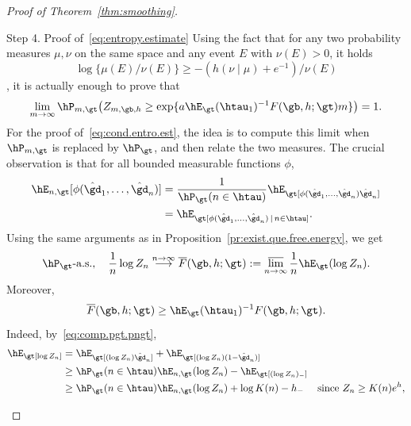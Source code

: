 \begin{proof}[Proof of Theorem~\ref{thm:smoothing}]
\begin{laststep}{Step 4. Proof of~\eqref{eq:entropy.estimate}}
Using the fact that for any two probability measures $\mu,\nu$ on the same space and any event $E$ with $\nu(E) > 0$, it holds
\begin{equation}
\log\{\mu(E)/\nu(E)\} \geq -(h(\nu \mid \mu) + e^{-1})/\nu(E)
\end{equation}
\cite[Equation~(A.13)]{Gi2007}, {it} is actually enough to prove that
\begin{equation}\label{eq:cond.entro.est}
\lim_{m\to\infty} \hP_{m,\gt} \big(Z_{m,\gb,h} \geq \exp\{a \hE_\gt(\htau_1)^{-1} F(\gb,h;\gt)m\} \big) = 1.
\end{equation}
For the proof of~\eqref{eq:cond.entro.est}, the idea is to compute this limit when $\hP_{m,\gt}$ is replaced by $\hP_\gt$, and then relate the two measures. The crucial observation is that for all bounded measurable functions $\phi$,
\begin{equation}\label{eq:comp.pgt.pngt}
\begin{aligned}
\hE_{n,\gt} [\phi(\hat \gd_1,\ldots,\hat \gd_n)] &= \frac{1}{\hP_\gt(n \in \htau)} \hE_\gt[\phi(\hat \gd_1,\ldots,\hat \gd_n) \hat \gd_n]\\
&= \hE_\gt[\phi(\hat \gd_1,\ldots,\hat \gd_n) \, \mid \, n \in \htau].
\end{aligned}
\end{equation}
Using the same arguments as in Proposition~\ref{pr:exist.que.free.energy}, we get
\begin{equation}\label{eq:conv.to.olF}
\hP_\gt \text{-a.s.}, \quad \frac{1}{n} \log Z_n \stackrel{n\to\infty}{\longrightarrow} \overline F(\gb,h;\gt) := \varlimsup_{n\to\infty} \frac{1}{n} \hE_\gt(\log Z_n).
\end{equation}
Moreover,
\begin{equation}\label{eq:comp.olF.F}
\overline F(\gb,h;\gt) \geq \hE_\gt(\htau_1)^{-1} F(\gb,h;\gt).
\end{equation}
Indeed, by~\eqref{eq:comp.pgt.pngt},
\begin{equation}
\begin{aligned}
\hE_\gt[\log Z_n] &= \hE_\gt[(\log Z_n) \hat \gd_n] + \hE_\gt[(\log Z_n) (1 - \hat \gd_n)]\\
&\geq \hP_\gt(n \in \htau) \hE_{n,\gt}(\log Z_n) - \hE_\gt[(\log Z_n)_-]\\
&\geq \hP_\gt(n \in \htau) \hE_{n,\gt}(\log Z_n) + \log K(n) - h_- \quad \text{ since } Z_n \geq K(n)e^h,
\end{aligned}

\end{equation}
\end{laststep}
\end{proof}
